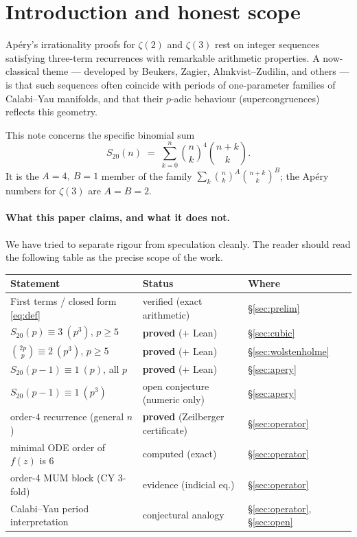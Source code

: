 \documentclass[11pt,a4paper]{article}
\theoremstyle{definition}
\theoremstyle{remark}
\newcommand{\Sx}{S_{20}}
\begin{document}
\tableofcontents

\section{Introduction and honest scope}

Ap\'ery's irrationality proofs for $\zeta(2)$ and $\zeta(3)$ rest on integer
sequences satisfying three-term recurrences with remarkable arithmetic
properties.  A now-classical theme --- developed by Beukers, Zagier,
Almkvist--Zudilin, and others --- is that such sequences often coincide with
periods of one-parameter families of Calabi--Yau manifolds, and that their
$p$-adic behaviour (supercongruences) reflects this geometry.

This note concerns the specific binomial sum
\begin{equation}\label{eq:def}
  \Sx(n) \;=\; \sum_{k=0}^{n}\binom{n}{k}^{4}\binom{n+k}{k}.
\end{equation}
It is the $A=4,\ B=1$ member of the family
$\sum_k \binom{n}{k}^A\binom{n+k}{k}^B$; the Ap\'ery numbers for $\zeta(3)$ are
$A=B=2$.

\paragraph{What this paper claims, and what it does not.}
We have tried to separate rigour from speculation cleanly. The reader should
read the following table as the precise scope of the work.

\begin{center}
\begin{tabular}{@{}lll@{}}
\toprule
Statement & Status & Where \\
\midrule
First terms / closed form \eqref{eq:def} & verified (exact arithmetic) & \S\ref{sec:prelim} \\
$\Sx(p)\equiv 3\ (p^3)$, $p\ge5$ & \textbf{proved} (+ Lean) & \S\ref{sec:cubic} \\
$\binom{2p}{p}\equiv 2\ (p^3)$, $p\ge5$ & \textbf{proved} (+ Lean) & \S\ref{sec:wolstenholme} \\
$\Sx(p-1)\equiv 1\ (p)$, all $p$ & \textbf{proved} (+ Lean) & \S\ref{sec:apery} \\
$\Sx(p-1)\equiv 1\ (p^3)$ & open conjecture (numeric only) & \S\ref{sec:apery} \\
order-4 recurrence (general $n$) & \textbf{proved} (Zeilberger certificate) & \S\ref{sec:operator} \\
minimal ODE order of $f(z)$ is $6$ & computed (exact) & \S\ref{sec:operator} \\
order-4 MUM block (CY 3-fold) & evidence (indicial eq.) & \S\ref{sec:operator} \\
Calabi--Yau period interpretation & conjectural analogy & \S\ref{sec:operator}, \S\ref{sec:open} \\
\bottomrule
\end{tabular}
\end{center}
\end{document}

